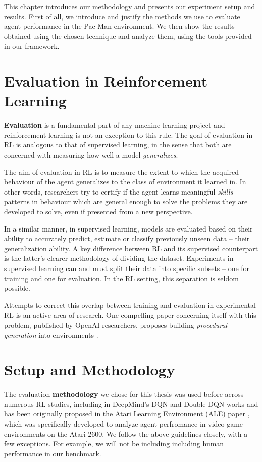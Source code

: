 This chapter introduces our methodology and presents our experiment setup and results.
First of all, we introduce and justify the methods we use to evaluate agent performance in the Pac-Man environment.
We then show the results obtained using the chosen technique and analyze them, using the tools provided in our framework.

\section*{Evaluation in Reinforcement Learning}
\textbf{Evaluation} is a fundamental part of any machine learning project and reinforcement learning is not an exception to this rule.
The goal of evaluation in RL is analogous to that of supervised learning, in the sense that both are concerned with measuring how well a model \emph{generalizes}.

The aim of evaluation in RL is to measure the extent to which the acquired behaviour of the agent generalizes to the class of environment it learned in.
In other words, researchers try to certify if the agent learns meaningful \emph{skills} -- patterns in behaviour which are general enough to solve the problems they are developed to solve, even if presented from a new perspective.

In a similar manner, in supervised learning, models are evaluated based on their ability to accurately predict, estimate or classify previously unseen data -- their generalization ability.
A key difference between RL and its supervised counterpart is the latter's clearer methodology of dividing the dataset.
Experiments in supervised learning can and must split their data into specific subsets -- one for training and one for evaluation. In the RL setting, this separation is seldom possible.

Attempts to correct this overlap between training and evaluation in experimental RL is an active area of research.
One compelling paper concerning itself with this problem, published by OpenAI researchers, proposes building \emph{procedural generation} into environments \cite{procgen-paper}.
\clearpage

\section*{Setup and Methodology}
The evaluation \textbf{methodology} we chose for this thesis was used before across numerous RL studies, including in DeepMind's DQN and Double DQN works \cite{atari-dqn,ddqn-paper} and has been originally proposed in the Atari Learning Environment (ALE) paper \cite{ale-paper}, which was specifically developed to analyze agent perfromance in video game environments on the Atari 2600.
We follow the above guidelines closely, with a few exceptions.
For example, we will not be including including human performance in our benchmark.

